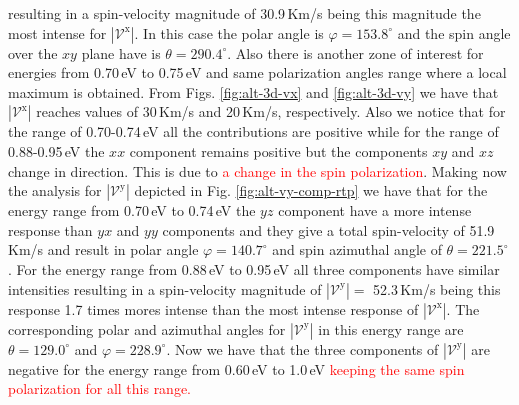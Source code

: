 \documentclass[prb,11pt,tightenlines,twocolumn,aps]{revtex4-1}
\begin{document}
resulting in a spin-velocity magnitude of 30.9\,Km/s being this magnitude the
most intense for $|\mathcal{V}^{\mathrm{x}}|$. In this case the polar angle is
$\varphi=153.8^{\circ}$ and the spin angle over the $xy$ plane have is
$\theta=290.4^{\circ}$.
%
Also there is another zone of interest for energies from 0.70\,eV to 0.75\,eV
and same polarization angles range where a local maximum is obtained. From Figs.
\ref{fig:alt-3d-vx} and \ref{fig:alt-3d-vy} we have that
$|\mathcal{V}^{\mathrm{x}}|$ reaches values of 30\,Km/s and 20\,Km/s,
respectively.
% 
Also we notice that for the range of 0.70-0.74\,eV all the contributions are
positive while for the range of 0.88-0.95\,eV the $xx$ component remains
positive but the components $xy$ and $xz$ change in direction. This is due to
\textcolor{red}{\large a change in the spin polarization}.
Making now the analysis for $|\mathcal{V}^{\mathrm{y}}|$ depicted in Fig.
\ref{fig:alt-vy-comp-rtp} we have that for the energy range from 0.70\,eV to
0.74\,eV the $yz$ component have a more intense response than $yx$ and $yy$
components and they give a total spin-velocity of 51.9\,Km/s and result in polar
angle $\varphi=140.7^{\circ}$ and spin azimuthal angle of
$\theta=221.5^{\circ}$.
%
For the energy range from 0.88\,eV to 0.95\,eV all three components have similar
intensities resulting in a spin-velocity magnitude of
$|\mathcal{V}^{\mathrm{y}}| =$ 52.3\,Km/s being this response 1.7 times mores
intense than the most intense response of $|\mathcal{V}^{\mathrm{x}}|$. The
corresponding polar and azimuthal angles for $|\mathcal{V}^{\mathrm{y}}|$ in
this energy range are $\theta = 129.0 ^{\circ}$ and $\varphi = 228.9 ^{\circ}$.
%
Now we have that the three components of $|\mathcal{V}^{\mathrm{y}}|$ are
negative for the energy range from 0.60\,eV to 1.0\,eV \textcolor{red}{keeping
the same spin polarization for all this range.} 
%
\end{document}
